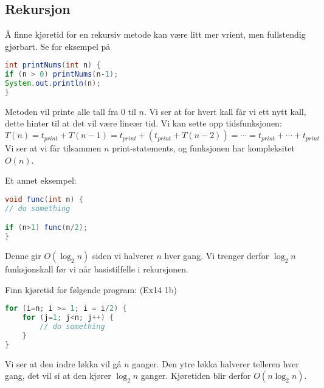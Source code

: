 \subsection{Rekursjon}
Å finne kjøretid for en rekursiv metode kan være litt mer vrient, men fullstendig gjørbart. Se for eksempel på 
\begin{lstlisting}[language=Java,
commentstyle=\color{source_brown}\monofontitalic, 
morekeywords={String},
keywordstyle=\color{source_blue}\monofontbold,
stringstyle=\color{source_orange}]
int printNums(int n) {
if (n > 0) printNums(n-1);
System.out.println(n);
}
\end{lstlisting}
Metoden vil printe alle tall fra $ 0 $ til $ n $. Vi ser at for hvert kall får vi ett nytt kall, dette hinter til at det vil være lineær tid. Vi kan sette opp tidsfunksjonen:
\[ T(n) = t_{print} + T(n-1) = t_{print} + (t_{print} + T(n-2)) = \cdots = t_{print} + \cdots + t_{print} \]
Vi ser at vi får tilsammen $ n $ print-statements, og funksjonen har kompleksitet $ O(n) $.

Et annet eksempel:

\begin{lstlisting}[language=Java,
commentstyle=\color{source_brown}\monofontitalic, 
morekeywords={String},
keywordstyle=\color{source_blue}\monofontbold,
stringstyle=\color{source_orange}]
void func(int n) {
// do something

if (n>1) func(n/2);
}
\end{lstlisting}
Denne gir $ O(\log_2 n) $ siden vi halverer $ n $ hver gang. Vi trenger derfor $ \log_2 n $ funksjonskall før vi når basistilfelle i rekursjonen. 


\begin{example} Finn kjøretid for følgende program: (Ex14 1b)

\begin{lstlisting}[language=Java,
commentstyle=\color{source_brown}\monofontitalic, 
morekeywords={String},
keywordstyle=\color{source_blue}\monofontbold,
stringstyle=\color{source_orange}]
for (i=n; i >= 1; i = i/2) {
    for (j=1; j<n; j++) {
        // do something
    }
}
\end{lstlisting}
Vi ser at den indre løkka vil gå $ n $ ganger. Den ytre løkka halverer telleren hver gang, det vil si at den kjører $ \log_2 n $ ganger. Kjøretiden blir derfor $ O(n\log_2 n) $.
\end{example}

